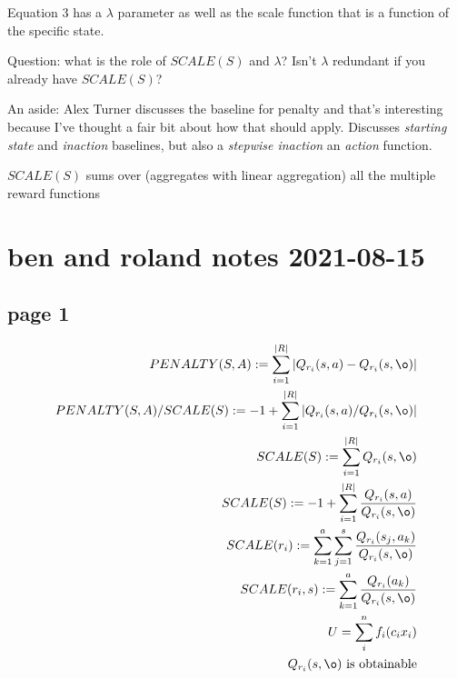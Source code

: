 Equation 3 has a $\lambda$ parameter as well as the scale function that is a function of the specific state.

Question: what is the role of $SCALE(S)$ and $\lambda$? Isn't $\lambda$ redundant if you already have $SCALE(S)$?

An aside: Alex Turner discusses the baseline for penalty and that's interesting because I've thought a fair bit about how that should apply. Discusses \emph{starting state} and \emph{inaction} baselines, but also a \emph{stepwise inaction} an \emph{action} function.

$SCALE(S)$ sums over (aggregates with linear aggregation) all the multiple reward functions

\section{ben and roland notes 2021-08-15}
\subsection{page 1}

\begin{align}
PENALTY(S,A) :=\sum^{|R|}_{i=1}|Q_{r_i}(s,a)-Q_{r_i}(s,\o) | \\

PENALTY(S,A) / SCALE(S) :=-1+\sum^{|R|}_{i=1}|Q_{r_i}(s,a)/Q_{r_i}(s,\o) | \\

SCALE(S) :=\sum^{|R|}_{i=1}Q_{r_i}(s,\o) \\

SCALE(S) :=-1+\sum^{|R|}_{i=1}\frac{Q_{r_i}(s,a)}{Q_{r_i}(s,\o)} \\

SCALE(r_i) :=\sum^{a}_{k=1}\sum^{s}_{j=1}\frac{Q_{r_i}(s_j,a_k)}{Q_{r_i}(s,\o)} \\

SCALE(r_i,s) :=\sum^{a}_{k=1}\frac{Q_{r_i}(a_k)}{Q_{r_i}(s,\o)} \\

U=\sum_{i}^n{f_i(c_i x_i)} \\



Q_{r_i}(s,\o) \text{ is obtainable}


\end{align}


